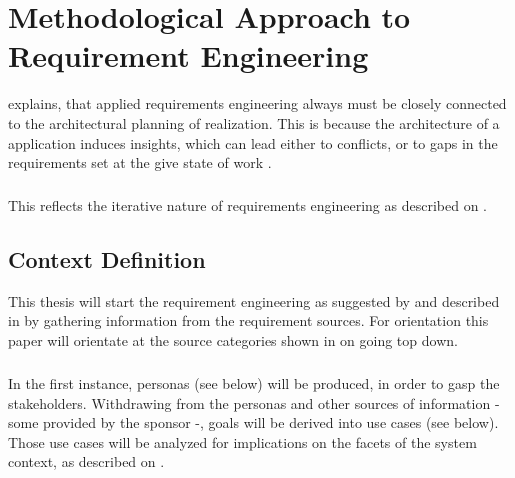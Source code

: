 \chapter{Methodological Approach to Requirement Engineering}
\textcite[22-23]{Pohl.2007} explains, that applied requirements engineering always must be closely connected to the architectural planning of realization. This is because the architecture of a application induces insights, which can lead either to conflicts, or to gaps in the requirements set at the give state of work \parencites[22-23]{Pohl.2007}. 
\paragraph{} This reflects the iterative nature of requirements engineering as described on .
\section{Context Definition}
This thesis will start the requirement engineering as suggested by \textcite{Pohl.2007} and described in  by gathering information from the requirement sources. For orientation this paper will orientate at the source categories shown in  on  going top down. 
\paragraph{} In the first instance, personas (see below) will be produced, in order to gasp the stakeholders. Withdrawing from the personas and other sources of information - some provided by the sponsor -, goals will be derived into use cases (see below). Those use cases will be analyzed for implications on the facets of the system context, as described on . 
